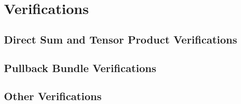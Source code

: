 \documentclass[../sean_thesis.tex]{subfiles}
\begin{document}
\section{Verifications}
\subsection{Direct Sum and Tensor Product Verifications}


\subsection{Pullback Bundle Verifications}
\label{sec:pullback}


\subsection{Other Verifications}


%
\end{document}
